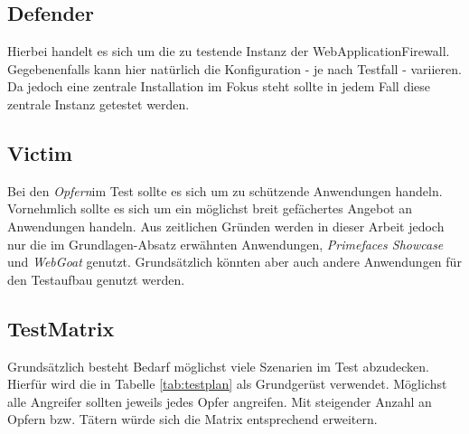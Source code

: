 \subsection{Defender}

Hierbei handelt es sich um die zu testende Instanz der WebApplicationFirewall. Gegebenenfalls kann hier natürlich die Konfiguration - je nach Testfall - variieren. Da jedoch eine zentrale Installation im Fokus steht sollte in jedem Fall diese zentrale Instanz getestet werden.

\subsection{Victim}

Bei den \glqq\emph{Opfern}\grqq  im Test sollte es sich um zu schützende Anwendungen handeln. Vornehmlich sollte es sich um ein möglichst breit gefächertes Angebot an Anwendungen handeln. Aus zeitlichen Gründen werden in dieser Arbeit jedoch nur die im Grundlagen-Absatz erwähnten Anwendungen, \emph{Primefaces Showcase} und \emph{WebGoat} genutzt. Grundsätzlich könnten aber auch andere Anwendungen für den Testaufbau genutzt werden.\\ 

\subsection{TestMatrix}
Grundsätzlich besteht Bedarf möglichst viele Szenarien im Test abzudecken. Hierfür wird die in Tabelle \ref{tab:testplan} als Grundgerüst verwendet. Möglichst alle Angreifer sollten jeweils jedes Opfer angreifen. Mit steigender Anzahl an Opfern bzw. Tätern würde sich die Matrix entsprechend erweitern.


